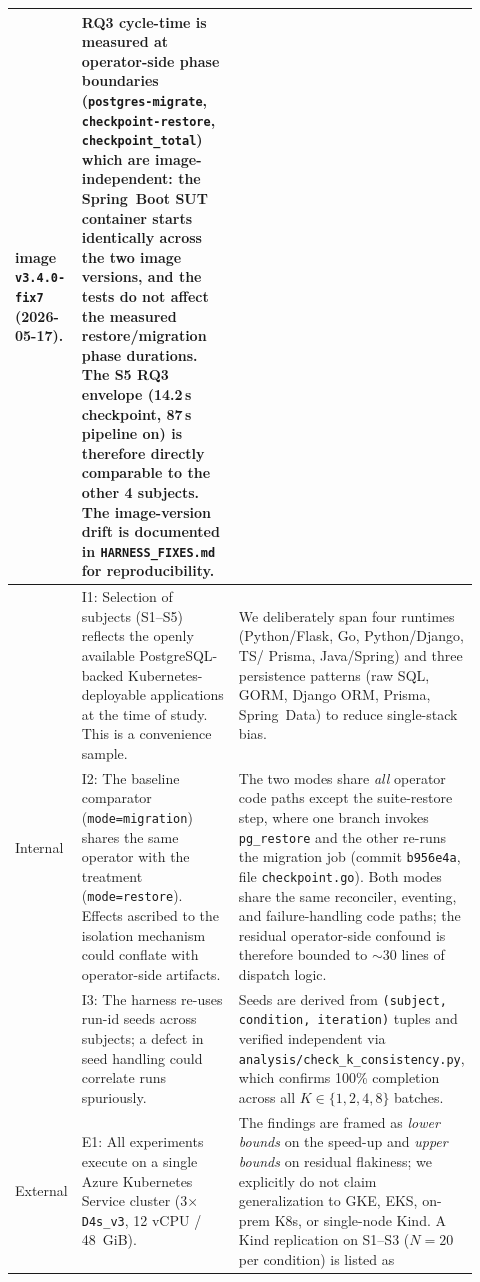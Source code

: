 \begin{table}[t]
\begin{tabular}{p{0.10\linewidth} p{0.36\linewidth} p{0.46\linewidth}}
   image \texttt{v3.4.0-fix7} (2026-05-17).
 & RQ3 cycle-time is measured at operator-side phase boundaries
   (\texttt{postgres-migrate}, \texttt{checkpoint-restore},
   \texttt{checkpoint\_total}) which are image-independent: the Spring~Boot
   SUT container starts identically across the two image versions, and the
   tests do not affect the measured restore/migration phase durations. The
   S5 RQ3 envelope (14.2\,s checkpoint, 87\,s pipeline on) is therefore
   directly comparable to the other 4 subjects. The image-version drift is
   documented in \texttt{HARNESS\_FIXES.md} for reproducibility. \\
\hline
\multirow{3}{*}{Internal}
 & I1: Selection of subjects (S1--S5) reflects the openly available
   PostgreSQL-backed Kubernetes-deployable applications at the time of study.
   This is a convenience sample.
 & We deliberately span four runtimes (Python/Flask, Go, Python/Django, TS/
   Prisma, Java/Spring) and three persistence patterns (raw SQL, GORM,
   Django ORM, Prisma, Spring~Data) to reduce single-stack bias. \\
 & I2: The baseline comparator (\texttt{mode=migration}) shares the same
   operator with the treatment (\texttt{mode=restore}). Effects ascribed
   to the isolation mechanism could conflate with operator-side artifacts.
 & The two modes share \emph{all} operator code paths
   except the suite-restore step, where one branch invokes \texttt{pg\_restore}
   and the other re-runs the migration job (commit \texttt{b956e4a}, file
   \texttt{checkpoint.go}). Both modes share the same reconciler,
   eventing, and failure-handling code paths; the residual operator-side
   confound is therefore bounded to ${\sim}30$ lines of dispatch logic. \\
 & I3: The harness re-uses run-id seeds across subjects; a defect in
   seed handling could correlate runs spuriously.
 & Seeds are derived from \texttt{(subject, condition, iteration)} tuples
   and verified independent via \texttt{analysis/check\_k\_consistency.py},
   which confirms 100\% completion across all $K \in \{1,2,4,8\}$ batches. \\
\hline
\multirow{3}{*}{External}
 & E1: All experiments execute on a single Azure Kubernetes Service cluster
   (3$\times$\texttt{D4s\_v3}, 12 vCPU / 48~GiB).
 & The findings are framed as \emph{lower bounds} on the speed-up and
   \emph{upper bounds} on residual flakiness; we explicitly do not claim
   generalization to GKE, EKS, on-prem K8s, or single-node Kind. A Kind
   replication on S1--S3 ($N=20$ per condition) is listed as

\end{tabular}
\end{table}
